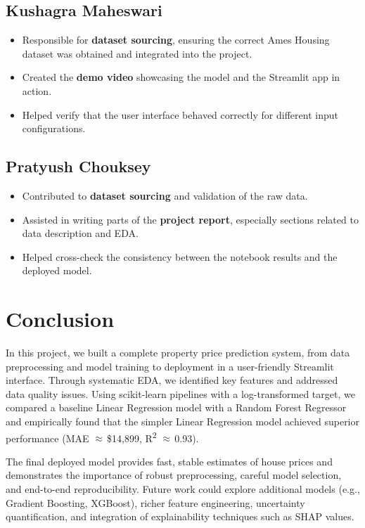 \documentclass[11pt,a4paper]{article}
\begin{document}
\subsection*{Kushagra Maheswari}

\begin{itemize}[leftmargin=*]
    \item Responsible for \textbf{dataset sourcing}, ensuring the correct Ames Housing dataset was obtained and integrated into the project.
    \item Created the \textbf{demo video} showcasing the model and the Streamlit app in action.
    \item Helped verify that the user interface behaved correctly for different input configurations.
\end{itemize}

\subsection*{Pratyush Chouksey}

\begin{itemize}[leftmargin=*]
    \item Contributed to \textbf{dataset sourcing} and validation of the raw data.
    \item Assisted in writing parts of the \textbf{project report}, especially sections related to data description and EDA.
    \item Helped cross-check the consistency between the notebook results and the deployed model.
\end{itemize}

\section{Conclusion}

In this project, we built a complete property price prediction system, from data preprocessing and model training to deployment in a user-friendly Streamlit interface.
Through systematic EDA, we identified key features and addressed data quality issues.
Using scikit-learn pipelines with a log-transformed target, we compared a baseline Linear Regression model with a Random Forest Regressor and empirically found that the simpler Linear Regression model achieved superior performance (MAE \(\approx\)\,\$14{,}899, R\textsuperscript{2} \(\approx\)\,0.93).

The final deployed model provides fast, stable estimates of house prices and demonstrates the importance of robust preprocessing, careful model selection, and end-to-end reproducibility.
Future work could explore additional models (e.g., Gradient Boosting, XGBoost), richer feature engineering, uncertainty quantification, and integration of explainability techniques such as SHAP values.
\end{document}
